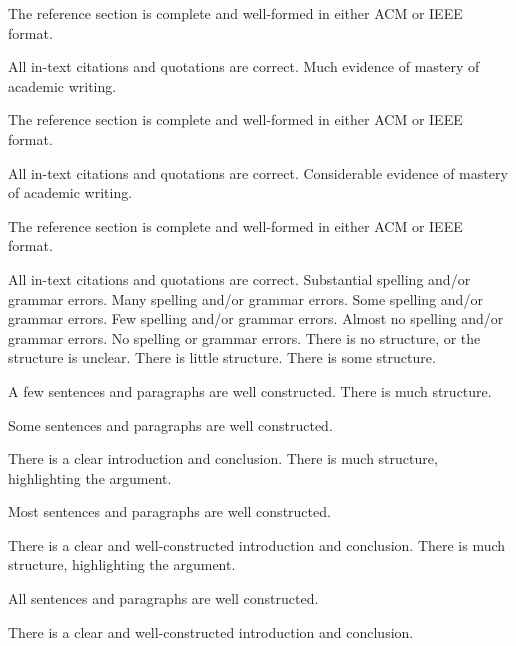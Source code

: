 \documentclass{../../fal_assignment}
\begin{document}
\begin{markingrubric}
        \par 		The reference section is complete and well-formed in either ACM or IEEE format.
        \par 		All in-text citations and quotations are correct.
        \grade 		Much evidence of mastery of academic writing.
        \par 		The reference section is complete and well-formed in either ACM or IEEE format.
        \par 		All in-text citations and quotations are correct.
        \grade 		Considerable evidence of mastery of academic writing.
        \par 		The reference section is complete and well-formed in either ACM or IEEE format.
        \par 		All in-text citations and quotations are correct.
%
        \grade\fail 	Substantial spelling and/or grammar errors.
        \grade 		Many spelling and/or grammar errors.
        \grade 		Some spelling and/or grammar errors.  
        \grade 		Few spelling and/or grammar errors.
        \grade 		Almost no spelling and/or grammar errors.
        \grade 		No spelling or grammar errors.
%
        \grade\fail 	There is no structure, or the structure is unclear.
        \grade 		There is little structure.
        \grade 		There is some structure.
        \par 		A few sentences and paragraphs are well constructed.
        \grade 		There is much structure.
        \par 		Some sentences and paragraphs are well constructed.
        \par 		There is a clear introduction and conclusion.
        \grade 		There is much structure, highlighting the argument.
        \par 		Most sentences and paragraphs are well constructed.
        \par 		There is a clear and well-constructed introduction and conclusion.
        \grade 		There is much structure, highlighting the argument.
        \par 		All sentences and paragraphs are well constructed.
        \par 		There is a clear and well-constructed introduction and conclusion.
\end{markingrubric}
\end{document}
